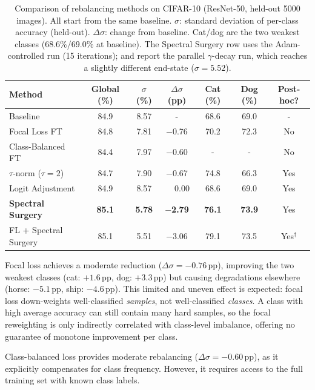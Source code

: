 \documentclass[11pt,a4paper]{article}
\begin{document}
\begin{table}[ht]
\centering
\caption{Comparison of rebalancing methods on CIFAR-10 (ResNet-50,
held-out 5000 images). All start from the same baseline.
$\sigma$: standard deviation of per-class accuracy (held-out).
$\Delta\sigma$: change from baseline. Cat/dog are the two weakest
classes (68.6\%/69.0\% at baseline). The Spectral Surgery row uses
the Adam-controlled run (15 iterations);  and
 report the parallel $\gamma$-decay run, which
reaches a slightly different end-state ($\sigma=5.52$).}
\label{tab:comparison}
\begin{tabular}{lcccccc}
\toprule
Method & Global (\%) & $\sigma$ (\%) & $\Delta\sigma$ (pp)
  & Cat (\%) & Dog (\%) & Post-hoc? \\
\midrule
Baseline              & 84.9 & 8.57 & -   & 68.6 & 69.0 & - \\
Focal Loss FT         & 84.8 & 7.81 & $-$0.76 & 70.2 & 72.3 & No \\
Class-Balanced FT     & 84.4 & 7.97 & $-$0.60 & -  & -  & No \\
$\tau$-norm ($\tau=2$)& 84.7 & 7.90 & $-$0.67 & 74.8 & 66.3 & Yes \\
Logit Adjustment      & 84.9 & 8.57 & $\phantom{+}$0.00 & 68.6 & 69.0 & Yes \\
\textbf{Spectral Surgery} & \textbf{85.1}
  & \textbf{5.78} & $\bm{-}$\textbf{2.79} & \textbf{76.1} & \textbf{73.9} & Yes \\
FL + Spectral Surgery  & 85.1 & 5.51 & $-$3.06 & 79.1 & 73.5 & Yes$^\dagger$ \\
\bottomrule
\end{tabular}
\smallskip\par{}
\end{table}


Focal loss achieves a moderate reduction
($\Delta\sigma = -0.76$\,pp), improving the two weakest classes
(cat: $+1.6$\,pp, dog: $+3.3$\,pp) but causing degradations elsewhere
(horse: $-5.1$\,pp, ship: $-4.6$\,pp). This limited and uneven effect
is expected: focal loss down-weights well-classified \emph{samples},
not well-classified \emph{classes}. A class with high average accuracy
can still contain many hard samples, so the focal reweighting is only
indirectly correlated with class-level imbalance, offering no
guarantee of monotone improvement per class.

Class-balanced loss provides moderate rebalancing
($\Delta\sigma = -0.60$\,pp), as it explicitly compensates for class
frequency. However, it requires access to the full training set with
known class labels.
\end{document}
